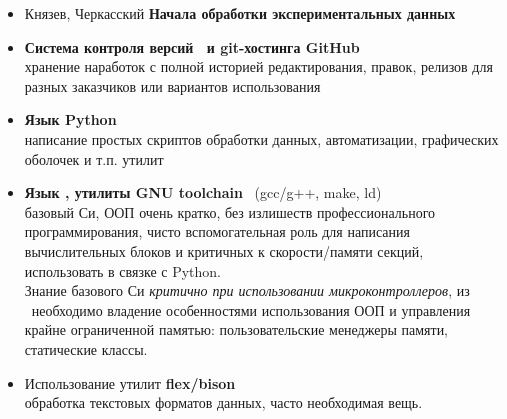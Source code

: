 
\begin{itemize}[nosep]
  \item Князев, Черкасский \textbf{Начала обработки экспериментальных данных}
  \cite{data}
\end{itemize}


\begin{itemize}[nosep]
  \item \textbf{Система контроля версий \ и git-хостинга
  GitHub}\\хранение наработок с полной историей редактирования, правок, релизов
  для разных заказчиков или вариантов использования
  \item \textbf{Язык Python}\ \cite{py}\\ написание простых скриптов обработки
  данных, автоматизации, графических оболочек и т.п. утилит
  \item \textbf{Язык \cpp, утилиты GNU toolchain} \cite{bogo,kumar}\ (gcc/g++,
  make, ld)\\базовый Си, ООП очень кратко, без
  излишеств профессионального программирования, чисто вспомогательная роль для
  написания вычислительных блоков и критичных к скорости/памяти секций,
  использовать в связке с Python.\\
  Знание базового Си \emph{критично при использовании микроконтроллеров},
  из \cpp\ необходимо владение особенностями использования ООП и управления
  крайне ограниченной памятью: пользовательские менеджеры памяти, статические
  классы.
  \item Использование утилит \textbf{flex/bison}\\обработка текстовых форматов
  данных, часто необходимая вещь.
\end{itemize}

